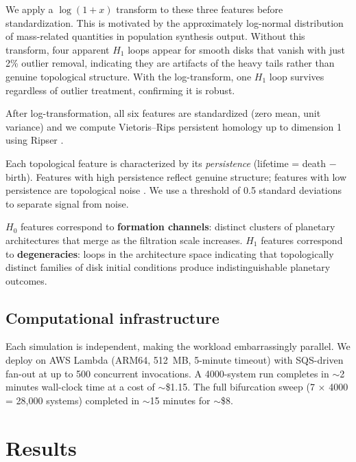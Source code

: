 \documentclass[twocolumn]{aastex631}
\begin{document}
We apply a $\log(1+x)$ transform to these three features before
standardization.  This is motivated by the approximately log-normal
distribution of mass-related quantities in population synthesis output.
Without this transform, four apparent $H_1$ loops appear for smooth disks
that vanish with just 2\% outlier removal, indicating they are artifacts of
the heavy tails rather than genuine topological structure.  With the
log-transform, one $H_1$ loop survives regardless of outlier treatment,
confirming it is robust.

After log-transformation, all six features are standardized (zero mean, unit
variance) and we compute Vietoris--Rips persistent homology up to dimension 1
using Ripser \citep{Bauer2021}.

Each topological feature is characterized by its \emph{persistence} (lifetime
= death $-$ birth).  Features with high persistence reflect genuine structure;
features with low persistence are topological noise
\citep{EdelsbrunnerHarer2010}.  We use a threshold of 0.5 standard deviations
to separate signal from noise.

$H_0$ features correspond to \textbf{formation channels}: distinct clusters
of planetary architectures that merge as the filtration scale increases.
$H_1$ features correspond to \textbf{degeneracies}: loops in the architecture
space indicating that topologically distinct families of disk initial
conditions produce indistinguishable planetary outcomes.

\subsection{Computational infrastructure}
\label{sec:infrastructure}

Each simulation is independent, making the workload embarrassingly parallel.
We deploy on AWS Lambda (ARM64, 512~MB, 5-minute timeout) with SQS-driven
fan-out at up to 500 concurrent invocations.  A 4000-system run completes in
$\sim$2 minutes wall-clock time at a cost of $\sim$\$1.15.  The full
bifurcation sweep (7 $\times$ 4000 = 28{,}000 systems) completed in
$\sim$15 minutes for $\sim$\$8.

\section{Results}
\label{sec:results}
\end{document}

